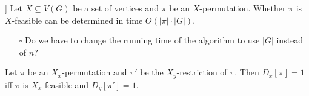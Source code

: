 \documentclass[fontsize=11pt,paper=a4]{book}
\begin{document}
\begin{lem}[[cite:@amiri2016congestionfree; Lemma 4.3]]
Let \(X\subseteq V(G)\) be a set of vertices and \(\pi\) be an \(X\)-permutation.
Whether \(\pi\) is \(X\)-feasible can be determined in time \(O(\lvert\pi\rvert\cdot\lvert G\rvert)\).
\label{orgbd9556e}
\end{lem}

\begin{itemize}
\item[{$\square$}] Do we have to change the running time of the algorithm to use \(\lvert G\rvert\) instead of \(n\)?
\end{itemize}

\begin{lem}
Let \(\pi\) be an \(X_x\)-permutation and \(\pi'\) be the \(X_y\)-restriction of \(\pi\).
Then \(D_x[\pi]=1\) iff \(\pi\) is \(X_x\)-feasible and \(D_y[\pi']=1\).
\label{org85ce86c}
\end{lem}
\end{document}
